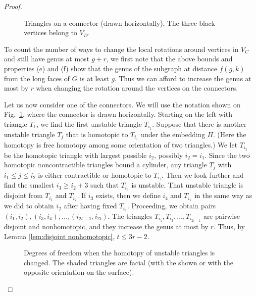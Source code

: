 \documentclass[10pt,a4paper]{amsart}
\begin{document}
\begin{proof}
\begin{figure}
\begin{center}

\end{center}
\caption{Triangles on a connector (drawn horizontally). The three black vertices belong to $V_D$.}
\label{fig:3}
\end{figure}

  To count the number of ways to change the local rotations around vertices in $V_C$ and still have genus at most $g+r$, we first note that the above bounds and properties (e) and (f) show that the genus of the subgraph at distance $f(g,k)$ from the long faces of $G$ is at least $g$. Thus we can afford to increase the genus at most by $r$ when changing the rotation around the vertices on the connectors.

  Let us now consider one of the connectors. We will use the notation shown on Fig.~\ref{fig:3}, where the connector is drawn horizontally. Starting on the left with triangle $T_1$, we find the first unstable triangle $T_{i_1}$. Suppose that there is another unstable triangle $T_j$ that is homotopic to $T_{i_1}$ under the embedding $\Pi$. (Here the homotopy is free homotopy among some orientation of two triangles.) We let $T_{i_2}$ be the homotopic triangle with largest possible $i_2$, possibly $i_2=i_1$. Since the two homotopic noncontractible triangles bound a cylinder, any triangle $T_j$ with $i_1\le j\le i_2$ is either contractible or homotopic to $T_{i_1}$. Then we look further and find the smallest $i_3\ge i_2+3$ such that $T_{i_3}$ is unstable. That unstable triangle is disjoint from $T_{i_1}$ and $T_{i_2}$. If $i_3$ exists, then we define $i_4$ and $T_{i_4}$ in the same way as we did to obtain $i_2$ after having fixed $T_{i_1}$. Proceeding, we obtain pairs $(i_1,i_2), (i_3,i_4), \dots, (i_{2t-1},i_{2t})$. The triangles $T_{i_1},T_{i_3},\dots, T_{i_{2t-1}}$ are pairwise disjoint and nonhomotopic, and they increase the genus at most by $r$. Thus, by Lemma \ref{lem:disjoint nonhomotopic}, $t\le 3r-2$.

\begin{figure}
\begin{center}

\end{center}
\caption{Degrees of freedom when the homotopy of unstable triangles is changed. The shaded triangles are facial (with the shown or with the opposite orientation on the surface).}
\label{fig:4}
\end{figure}


\end{proof}
\end{document}
